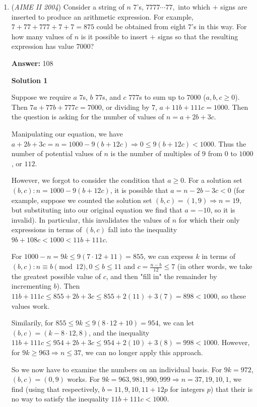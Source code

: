 \begin{enumerate}
 


	\item (\textit{AIME II 2004}) Consider a string of $n$ $7$'s, $7777\cdots77,$ into which $+$ signs are inserted to produce an arithmetic expression. For example, $7+77+777+7+7=875$ could be obtained from eight $7$'s in this way. For how many values of $n$ is it possible to insert $+$ signs so that the resulting expression has value $7000$?


 
 \textbf{Answer: }108



\textbf{Solution 1}

Suppose we require $a$ $7$s, $b$ $77$s, and $c$ $777$s to sum up to $7000$ ($a,b,c \ge 0$). Then $7a + 77b + 777c = 7000$, or dividing by $7$, $a + 11b + 111c = 1000$. Then the question is asking for the number of values of $n = a + 2b + 3c$.

 Manipulating our equation, we have $a + 2b + 3c = n = 1000 - 9(b + 12c) \Longrightarrow 0 \le 9(b+12c) < 1000$. Thus the number of potential values of $n$ is the number of multiples of $9$ from $0$ to $1000$, or $112$.

 
However, we forgot to consider the condition that $a \ge 0$. For a solution set $(b,c): n=1000-9(b+12c)$, it is possible that $a = n-2b-3c < 0$ (for example, suppose we counted the solution set $(b,c) = (1,9) \Longrightarrow n = 19$, but substituting into our original equation we find that $a = -10$, so it is invalid). In particular, this invalidates the values of $n$ for which their only expressions in terms of $(b,c)$ fall into the inequality $9b + 108c < 1000 < 11b + 111c$.  

 For $1000 - n = 9k \le 9(7 \cdot 12 + 11) = 855$, we can express $k$ in terms of $(b,c): n \equiv b \pmod{12}, 0 \le b \le 11$ and $c = \frac{n-b}{12} \le 7$ (in other words, we take the greatest possible value of $c$, and then "fill in" the remainder by incrementing $b$). Then $11b + 111c \le 855 + 2b + 3c \le 855 + 2(11) + 3(7) = 898 < 1000$, so these values work. 

 Similarily, for $855 \le 9k \le 9(8 \cdot 12 + 10) = 954$, we can let $(b,c) = (k-8 \cdot 12,8)$, and the inequality $11b + 111c \le 954 + 2b + 3c \le 954 + 2(10) + 3(8) = 998 < 1000$. However, for $9k \ge 963 \Longrightarrow n \le 37$, we can no longer apply this approach. 

 So we now have to examine the numbers on an individual basis. For $9k = 972$, $(b,c) = (0,9)$ works. For $9k = 963, 981, 990, 999 \Longrightarrow n = 37, 19, 10, 1$, we find (using that respectively, $b = 11,9,10,11 + 12p$ for integers $p$) that their is no way to satisfy the inequality $11b + 111c < 1000$. 


\end{enumerate}
